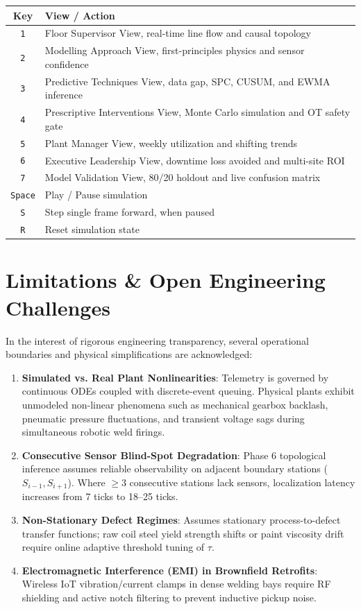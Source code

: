 \documentclass[11pt]{article}
\begin{document}
\begin{center}
\begin{tabular}{cp{11cm}}
\toprule
\textbf{Key} & \textbf{View / Action} \\
\midrule
\texttt{1} & Floor Supervisor View, real-time line flow and causal topology \\
\texttt{2} & Modelling Approach View, first-principles physics and sensor confidence \\
\texttt{3} & Predictive Techniques View, data gap, SPC, CUSUM, and EWMA inference \\
\texttt{4} & Prescriptive Interventions View, Monte Carlo simulation and OT safety gate \\
\texttt{5} & Plant Manager View, weekly utilization and shifting trends \\
\texttt{6} & Executive Leadership View, downtime loss avoided and multi-site ROI \\
\texttt{7} & Model Validation View, 80/20 holdout and live confusion matrix \\
\texttt{Space} & Play / Pause simulation \\
\texttt{S} & Step single frame forward, when paused \\
\texttt{R} & Reset simulation state \\
\bottomrule
\end{tabular}
\end{center}

\section{Limitations \& Open Engineering Challenges}

In the interest of rigorous engineering transparency, several operational boundaries and physical simplifications are acknowledged:
\begin{enumerate}[leftmargin=1.2cm]
  \item \textbf{Simulated vs. Real Plant Nonlinearities}: Telemetry is governed by continuous ODEs coupled with discrete-event queuing. Physical plants exhibit unmodeled non-linear phenomena such as mechanical gearbox backlash, pneumatic pressure fluctuations, and transient voltage sags during simultaneous robotic weld firings.
  \item \textbf{Consecutive Sensor Blind-Spot Degradation}: Phase 6 topological inference assumes reliable observability on adjacent boundary stations ($S_{i-1}, S_{i+1}$). Where $\ge 3$ consecutive stations lack sensors, localization latency increases from 7 ticks to 18--25 ticks.
  \item \textbf{Non-Stationary Defect Regimes}: Assumes stationary process-to-defect transfer functions; raw coil steel yield strength shifts or paint viscosity drift require online adaptive threshold tuning of $\tau$.
  \item \textbf{Electromagnetic Interference (EMI) in Brownfield Retrofits}: Wireless IoT vibration/current clamps in dense welding bays require RF shielding and active notch filtering to prevent inductive pickup noise.
\end{enumerate}
\end{document}
